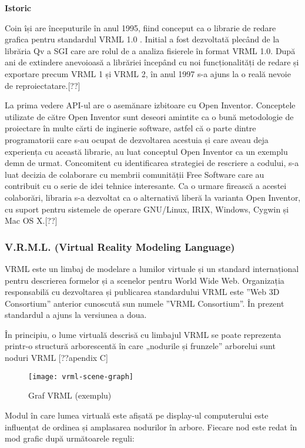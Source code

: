 \par \textbf{Istoric}
\par Coin își are începuturile în anul 1995, fiind conceput ca o librarie de redare grafica pentru standardul VRML 1.0 . Initial a fost dezvoltată plecând de la librăria Qv a SGI care are rolul de a analiza fisierele în format VRML 1.0. După ani de extindere anevoioasă a librăriei începând cu noi funcționalități de redare și exportare precum VRML 1 și VRML 2, în anul 1997 s-a ajuns la o reală nevoie de reproiectatare.[??]
\par La prima vedere API-ul are o asemănare izbitoare cu Open Inventor. Conceptele utilizate de către Open Inventor sunt deseori amintite ca o bună metodologie de proiectare în multe cărti de inginerie software, astfel că o parte dintre programatorii care s-au ocupat de dezvoltarea acestuia și care aveau deja experiența cu această librarie, au luat conceptul Open Inventor ca un exemplu demn de urmat. Concomitent cu identificarea strategiei de rescriere a codului, s-a luat decizia de colaborare cu membrii comunității Free Software care au contribuit cu o serie de idei tehnice interesante. Ca o urmare firească a acestei colaborări, libraria s-a dezvoltat ca o alternativă liberă la varianta Open Inventor, cu suport pentru sistemele de operare GNU/Linux, IRIX, Windows, Cygwin și Mac OS X.[??]

\subsubsection{V.R.M.L. (Virtual Reality Modeling Language)}
\par VRML este un limbaj de modelare a lumilor virtuale și un standard internațional pentru descrierea formelor și a scenelor pentru World Wide Web. Organizația responsabilă cu dezvoltarea și publicarea standardului VRML este ”Web 3D Consortium” anterior cunoscută sun numele ”VRML Consortium”. În prezent standardul a ajuns la versiunea a doua.
\par În principiu, o lume virtuală descrisă cu limbajul VRML se poate reprezenta printr-o structură arborescentă în care „nodurile și frunzele” arborelui sunt noduri VRML [??apendix C]

\begin{figure}[h]
    \centering
    \texttt{[image: vrml-scene-graph]}
    \caption{Graf VRML (exemplu)}
    \label{fig:graphvrml}
\end{figure}

\par Modul în care lumea virtuală este afișată pe display-ul computerului  este influențat de ordinea și amplasarea nodurilor în arbore. Fiecare nod este redat în mod grafic după următoarele reguli:

